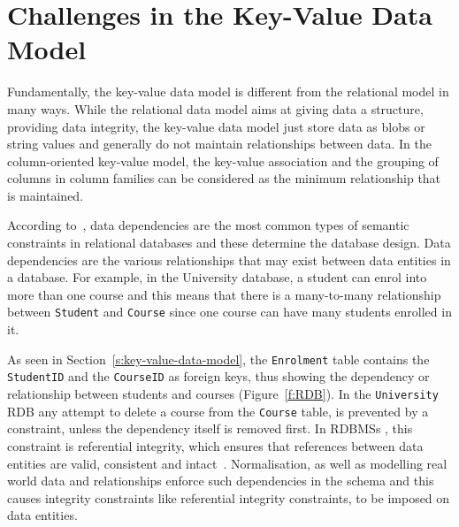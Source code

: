 \section{Challenges in the Key-Value Data Model}\label{s:challenges-key-value}
Fundamentally,   the key-value data model is different from the relational model
in many ways.  While the relational data model aims at giving data a structure,  
providing data integrity,   the key-value data model just
store data as \acp{blob} or string values and generally do not maintain
relationships between data.  In the column-oriented key-value model,   the
key-value association and the grouping of columns in column families can be
considered as the minimum relationship that is maintained.

According to~\citet{Bell},   data dependencies
are the most common types of semantic constraints in relational databases and these
determine the database design.  Data dependencies are the various relationships
that may exist between data entities in a database.  For example,   in the
University database,   a student can enrol into more than one course and this
means that there is a many-to-many relationship between \texttt{Student} and
\texttt{Course} since   one course can have many students enrolled in it.

As seen in Section~\ref{s:key-value-data-model},   the \texttt{Enrolment} table
contains the \texttt{StudentID} and the \texttt{CourseID} as foreign keys, thus
showing the dependency or relationship between students and courses
(Figure~\ref{f:RDB}).
In the \texttt{University} \ac{RDB} any attempt to delete a course from the
\texttt{Course} table,   is prevented by a constraint,   unless the dependency
itself is removed first.  In \acp{RDBMS} ,   this constraint is referential
integrity,   which ensures that references between data entities are valid,
consistent and intact~\citep{blaha,date}.
Normalisation,   as well as modelling real world data and relationships enforce
such dependencies in the schema and this causes integrity constraints like
referential integrity constraints,   to be imposed on data entities.

